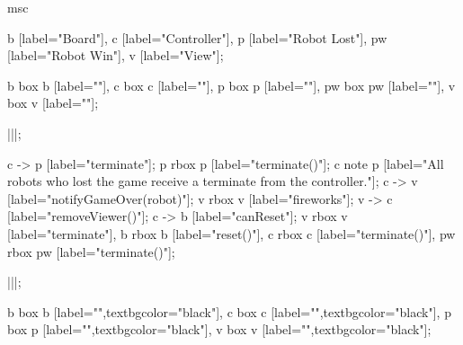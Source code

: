 \begin{msc}
msc
{

b [label="Board"],
c [label="Controller"],
p [label="Robot Lost"],
pw [label="Robot Win"],
v [label="View"];

b box b [label=""],
c box c [label=""],
p box p [label=""],
pw box pw [label=""],
v box v [label=""];

|||;

c -> p [label="terminate"];
p rbox p [label="terminate()"];
c note p [label="All robots who lost the game receive a terminate from the controller."];
c -> v [label="notifyGameOver(robot)"];
v rbox v [label="fireworks"];
v -> c [label="removeViewer()"];
c -> b [label="canReset"];
v rbox v [label="terminate"],
b rbox b [label="reset()"],
c rbox c [label="terminate()"],
pw rbox pw [label="terminate()"];


|||;

b box b [label="",textbgcolor="black"],
c box c [label="",textbgcolor="black"],
p box p [label="",textbgcolor="black"],
v box v [label="",textbgcolor="black"];

}
\end{msc}
